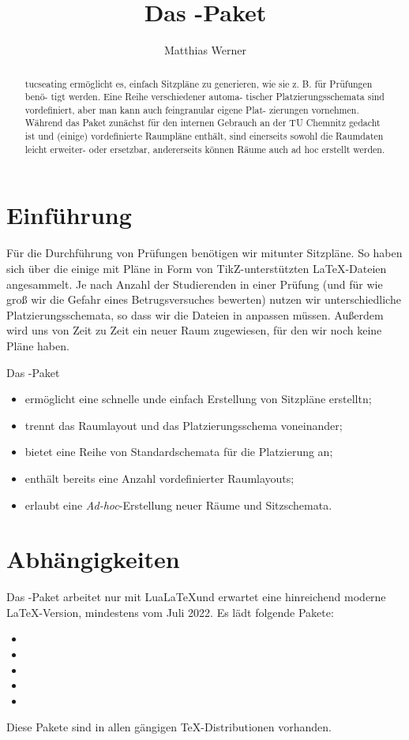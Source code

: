 \documentclass[
babel=ngerman
]{skdoc}
\author{Matthias Werner}
\title{Das \thepkg-Paket}
\begin{document}
\maketitle

\begin{abstract}
    tucseating ermöglicht es, einfach Sitzpläne zu
generieren, wie sie z. B. für Prüfungen benö-
tigt werden. Eine Reihe verschiedener automa-
tischer Platzierungsschemata sind vordefiniert,
aber man kann auch feingranular eigene Plat-
zierungen vornehmen.
Während das Paket zunächst für den internen
Gebrauch an der TU Chemnitz gedacht ist und
(einige) vordefinierte Raumpläne enthält, sind
einerseits sowohl die Raumdaten leicht erweiter-
oder ersetzbar, andererseits können Räume auch
ad hoc erstellt werden.
\end{abstract}
\tableofcontents

\section{Einführung}
Für die Durchführung von Prüfungen benötigen wir mitunter Sitzpläne.
So haben sich über die einige mit Pläne  in Form von TikZ-unterstützten
\LaTeX-Dateien angesammelt. 
Je nach Anzahl der Studierenden in einer Prüfung (und für wie groß wir die
Gefahr eines Betrugsversuches bewerten) nutzen wir unterschiedliche
Platzierungsschemata, so dass wir die Dateien in anpassen müssen.
Außerdem wird uns von Zeit zu Zeit ein neuer Raum zugewiesen, für den wir noch
keine Pläne haben.

Das \thepkg-Paket 
\begin{itemize}
  \item ermöglicht eine schnelle unde einfach Erstellung von Sitzpläne erstelltn;
  \item trennt das Raumlayout und das Platzierungsschema voneinander;
  \item bietet eine Reihe von Standardschemata für die Platzierung an;
  \item enthält bereits eine Anzahl vordefinierter Raumlayouts;
  \item erlaubt eine \emph{Ad-hoc}-Erstellung neuer Räume und Sitzschemata.
\end{itemize}

\section{Abhängigkeiten}
Das \thepkg-Paket arbeitet nur mit Lua\LaTeX und erwartet eine hinreichend
moderne \LaTeX-Version, mindestens vom Juli 2022.
Es lädt folgende Pakete:
\begin{itemize}
  \item {} 
  \item {}
  \item {}
  \item {}
  \item {}
\end{itemize}
Diese Pakete sind in allen gängigen \TeX-Distributionen vorhanden.
\end{document}
